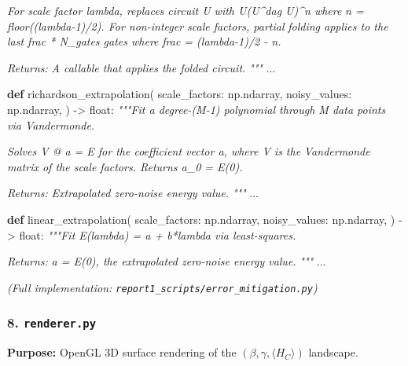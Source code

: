 \documentclass[
  11pt,
]{report}
\newenvironment{Shaded}{}{}
\newcommand{\BuiltInTok}[1]{\textcolor[rgb]{0.00,0.50,0.00}{#1}}
\newcommand{\CommentTok}[1]{\textcolor[rgb]{0.38,0.63,0.69}{\textit{#1}}}
\newcommand{\KeywordTok}[1]{\textcolor[rgb]{0.00,0.44,0.13}{\textbf{#1}}}
\newcommand{\NormalTok}[1]{#1}
\newcommand{\OperatorTok}[1]{\textcolor[rgb]{0.40,0.40,0.40}{#1}}
\begin{document}
\begin{Shaded}
\begin{Highlighting}[]
\CommentTok{    For scale factor lambda, replaces circuit U with U(U\^{}dag U)\^{}n where}
\CommentTok{    n = floor((lambda{-}1)/2). For non{-}integer scale factors, partial}
\CommentTok{    folding applies to the last frac * N\_gates gates where}
\CommentTok{    frac = (lambda{-}1)/2 {-} n.}

\CommentTok{    Returns:}
\CommentTok{        A callable that applies the folded circuit.}
\CommentTok{    """}
\NormalTok{    ...}


\KeywordTok{def}\NormalTok{ richardson\_extrapolation(}
\NormalTok{    scale\_factors: np.ndarray,}
\NormalTok{    noisy\_values: np.ndarray,}
\NormalTok{) }\OperatorTok{{-}\textgreater{}} \BuiltInTok{float}\NormalTok{:}
    \CommentTok{"""Fit a degree{-}(M{-}1) polynomial through M data points via Vandermonde.}

\CommentTok{    Solves V @ a = E for the coefficient vector a, where V is the}
\CommentTok{    Vandermonde matrix of the scale factors. Returns a\_0 = E(0).}

\CommentTok{    Returns:}
\CommentTok{        Extrapolated zero{-}noise energy value.}
\CommentTok{    """}
\NormalTok{    ...}


\KeywordTok{def}\NormalTok{ linear\_extrapolation(}
\NormalTok{    scale\_factors: np.ndarray,}
\NormalTok{    noisy\_values: np.ndarray,}
\NormalTok{) }\OperatorTok{{-}\textgreater{}} \BuiltInTok{float}\NormalTok{:}
    \CommentTok{"""Fit E(lambda) = a + b*lambda via least{-}squares.}

\CommentTok{    Returns:}
\CommentTok{        a = E(0), the extrapolated zero{-}noise energy value.}
\CommentTok{    """}
\NormalTok{    ...}
\end{Highlighting}
\end{Shaded}

\emph{(Full implementation:
\texttt{report1\_scripts/error\_mitigation.py})}

\subsubsection{\texorpdfstring{8.
\texttt{renderer.py}}{8. renderer.py}}\label{renderer.py}

\textbf{Purpose:} OpenGL 3D surface rendering of the
\((\beta, \gamma, \langle H_C \rangle)\) landscape.
\end{document}
